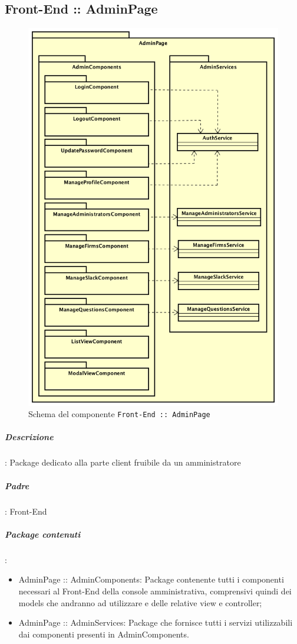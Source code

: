 \documentclass[../ManualeSviluppatore_v1.0.0.tex]{subfiles}
\begin{document}
	\newpage
	\subsection{Front-End :: AdminPage}
	\begin{figure}[!h]
		\centering
		\includegraphics[scale=0.3]{Architettura/Front-End/AdminPage/AdminPage.png}
		\caption{Schema del componente \texttt{Front-End :: AdminPage}}
	\end{figure}
			\subparagraph{Descrizione}: Package dedicato alla parte client fruibile da un amministratore
			\subparagraph{Padre}: Front-End
			\subparagraph{Package contenuti}:
			\begin{itemize}
				\item AdminPage :: AdminComponents: Package contenente tutti i componenti necessari al Front-End della console amministrativa, comprensivi quindi dei models che andranno ad utilizzare e delle relative view e controller;
				\item AdminPage :: AdminServices: Package che fornisce tutti i servizi utilizzabili dai componenti presenti in AdminComponents.
			\end{itemize}
\end{document}
